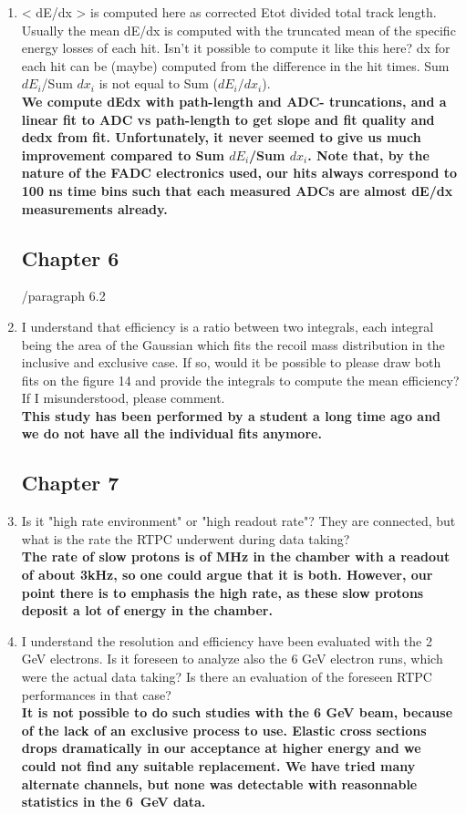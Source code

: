 \documentclass[a4paper,11pt,twoside]{article}
\begin{document}
\begin{enumerate}
\item < dE/dx > is computed here as corrected Etot divided total track length. 
   Usually the mean dE/dx is computed with the truncated mean of the specific 
   energy losses of each hit. Isn't it possible to compute it like this here? 
   dx for each hit can be (maybe) computed from the difference in the hit 
   times. Sum $dE_{i}$/Sum $dx_{i}$ is not equal to Sum ($dE_{i}/dx_{i}$).\\
{ \bf We compute dEdx with path-length and ADC- 
truncations, and a linear fit to ADC vs path-length to get slope and fit 
quality and dedx from fit. Unfortunately, it never seemed to give us much 
improvement compared to Sum $dE_{i}$/Sum $dx_{i}$. Note that, by the nature of 
the FADC electronics used, our hits always correspond to 100 ns time bins such that
each measured ADCs are almost dE/dx measurements already.}

\subsection*{ Chapter 6}

        /paragraph 6.2
\item I understand that efficiency is a ratio between two integrals, each 
   integral being the area of the Gaussian which fits the recoil mass 
   distribution in the inclusive and exclusive case. If so, would it be 
   possible to please draw both fits on the figure 14 and provide the integrals 
   to compute the mean efficiency? If I misunderstood, please comment.\\
{ \bf This study has been performed by a student a long time
ago and we do not have all the individual fits anymore.} 

\subsection*{ Chapter 7} 

\item Is it "high rate environment" or "high readout rate"? They are connected, 
   but what is the rate the RTPC underwent during data taking?\\
{ \bf The rate of slow protons is of MHz in the chamber with a readout of
about 3kHz, so one could argue that it is both. However, our point there is to emphasis
the high rate, as these slow protons deposit a lot of energy in the chamber.} 

\item I understand the resolution and efficiency have been evaluated with the 2 
   GeV electrons. Is it foreseen to analyze also the 6 GeV electron runs, which 
   were the actual data taking? Is there an evaluation of the foreseen RTPC 
   performances in that case?\\
{ \bf It is not possible to do such studies with the 6 GeV beam, because 
of the lack of an exclusive process to use. Elastic cross sections drops dramatically 
in our acceptance at higher energy and we could not find any suitable replacement. We 
have tried many alternate channels, but none was detectable with reasonnable statistics
in the 6~GeV data.} 


\end{enumerate}
\end{document}
